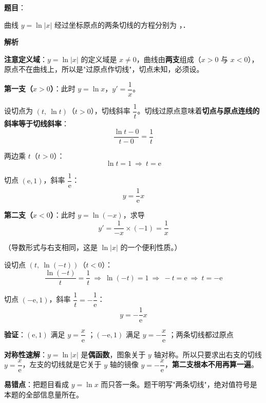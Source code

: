 \begin{answer}

\textbf{题目}：

曲线 $y=\ln|x|$ 经过坐标原点的两条切线的方程分别为 \gkblank{}，\gkblank{}．

\textbf{解析}

\textbf{注意定义域}：$y=\ln|x|$ 的定义域是 $x\ne0$，曲线由\textbf{两支}组成（$x>0$ 与 $x<0$），原点不在曲线上，所以是"过原点作切线"，切点未知，必须设。

\textbf{第一支（$x>0$）}：此时 $y=\ln x$，$y'=\dfrac1x$。

设切点为 $\left(t,\ \ln t\right)$（$t>0$），切线斜率 $\dfrac1t$。切线过原点意味着\textbf{切点与原点连线的斜率等于切线斜率}：
\nopagebreak[4]
\[\frac{\ln t-0}{t-0}=\frac1t\]

两边乘 $t$（$t>0$）：
\nopagebreak[4]
\[\ln t=1\ \Longrightarrow\ t=\mathrm e\]

切点 $(\mathrm e,1)$，斜率 $\dfrac1{\mathrm e}$：
\nopagebreak[4]
\[y=\frac1{\mathrm e}x\]

\textbf{第二支（$x<0$）}：此时 $y=\ln(-x)$，求导
\nopagebreak[4]
\[y'=\frac1{-x}\times(-1)=\frac1x\]

（导数形式与右支相同，这是 $\ln|x|$ 的一个便利性质。）

设切点 $\left(t,\ \ln(-t)\right)$（$t<0$）：
\nopagebreak[4]
\[\frac{\ln(-t)}{t}=\frac1t\ \Longrightarrow\ \ln(-t)=1\ \Longrightarrow\ -t=\mathrm e\ \Longrightarrow\ t=-\mathrm e\]

切点 $(-\mathrm e,1)$，斜率 $\dfrac1t=-\dfrac1{\mathrm e}$：
\nopagebreak[4]
\[y=-\frac1{\mathrm e}x\]

\textbf{验证}：$(\mathrm e,1)$ 满足 $y=\dfrac x{\mathrm e}$ ；$(-\mathrm e,1)$ 满足 $y=-\dfrac x{\mathrm e}$ ；两条切线都过原点 

\begin{gktip}
\textbf{对称性速解}：$y=\ln|x|$ 是\textbf{偶函数}，图象关于 $y$ 轴对称。所以只要求出右支的切线 $y=\dfrac x{\mathrm e}$，左支的切线就是它关于 $y$ 轴的镜像 $y=-\dfrac x{\mathrm e}$，\textbf{第二支根本不用再算一遍}。

\textbf{易错点}：把题目看成 $y=\ln x$ 而只答一条。题干明写"两条切线"，绝对值符号是本题的全部信息量所在。
\end{gktip}


\par\medskip

\end{answer}

